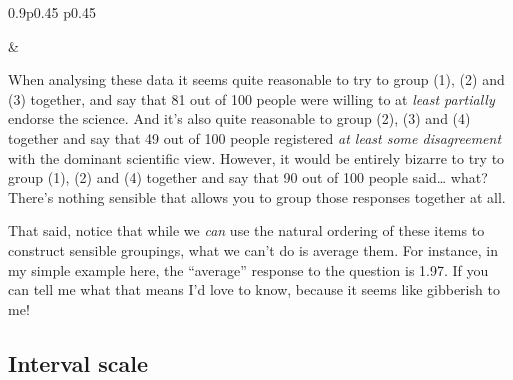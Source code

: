 \documentclass[
  a4paper,
]{book}
\begin{document}
\begin{table}[ht]
\begin{centerbox}
\begin{threeparttable}
\begin{tabularx}{0.9\textwidth}{p{} p{}}
\hhline{}

 &
 \tabularnewline[-0.5pt]


\end{tabularx} 

\end{threeparttable}\par\end{centerbox}

\end{table}
 

When analysing these data it seems quite reasonable to try to group (1),
(2) and (3) together, and say that 81 out of 100 people were willing to
at \emph{least partially} endorse the science. And it's also quite
reasonable to group (2), (3) and (4) together and say that 49 out of 100
people registered \emph{at least some disagreement} with the dominant
scientific view. However, it would be entirely bizarre to try to group
(1), (2) and (4) together and say that 90 out of 100 people said\ldots{}
what? There's nothing sensible that allows you to group those responses
together at all.

That said, notice that while we \emph{can} use the natural ordering of
these items to construct sensible groupings, what we can't do is average
them. For instance, in my simple example here, the ``average'' response
to the question is 1.97. If you can tell me what that means I'd love to
know, because it seems like gibberish to me!

\hypertarget{interval-scale}{%
\subsection{Interval scale}\label{interval-scale}}
\end{document}
